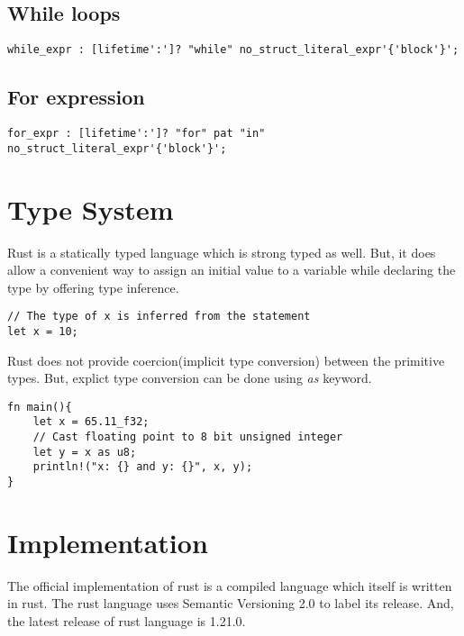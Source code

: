 \documentclass[12pt, titlepage]{article}
\begin{document}
\subsection{While loops}
\begin{lstlisting}
while_expr : [lifetime':']? "while" no_struct_literal_expr'{'block'}';
\end{lstlisting}

\subsection{For expression}
\begin{lstlisting}
for_expr : [lifetime':']? "for" pat "in" no_struct_literal_expr'{'block'}';
\end{lstlisting}

\section{Type System}
Rust is a statically typed language which is strong typed\cite{RustIntro} as well. But, it does allow a convenient way to
assign an initial value to a variable while declaring the type by offering type inference.

\begin{lstlisting}
// The type of x is inferred from the statement
let x = 10;
\end{lstlisting}

Rust does not provide coercion(implicit type conversion) between the primitive types. But, explict type conversion can
be done using \textit{as} keyword.

\begin{lstlisting}
fn main(){
    let x = 65.11_f32;
    // Cast floating point to 8 bit unsigned integer
    let y = x as u8;
    println!("x: {} and y: {}", x, y);
}
\end{lstlisting}

\section{Implementation}
The official implementation of rust is a compiled language which itself is written in rust. The rust
language uses Semantic Versioning 2.0\cite{SemVer} to label its release. And, the latest release of rust language is 1.21.0\cite{Rust1.21}.



\end{document}
